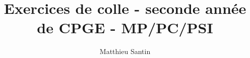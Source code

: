 \usepackage{style/physique} %

\title{Exercices de colle - seconde année de CPGE - MP/PC/PSI}
\author{Matthieu Santin}

\pagestyle{fancy}
\renewcommand\headrulewidth{1pt}
\fancyfoot[C]{\thepage/\pageref{LastPage}  \hyperref[toc]{$\uparrow$}}
\fancyfoot[R]{}




\frontmatter

\mainmatter
















